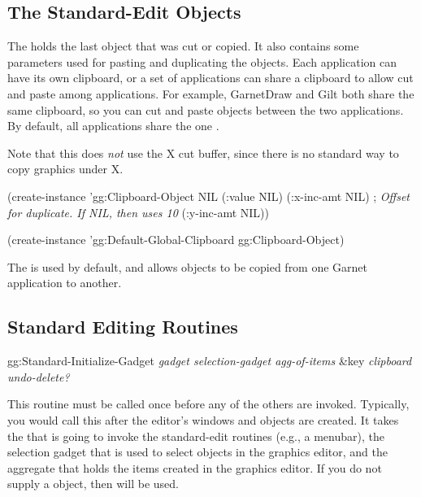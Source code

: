 \subsection{The Standard-Edit Objects}

The  holds the last object that was cut or
copied.  It also contains some parameters used for pasting and
duplicating the objects.  Each application can have its own
clipboard, or a set of applications can share a clipboard to allow cut
and paste among applications.  For example, GarnetDraw and Gilt both share
the same clipboard, so you can cut and paste objects between the two
applications.  By default, all applications share the
one .

Note that this does {\it not} use the X cut buffer, since there is no
standard way to copy graphics under X.

\begin{programexample}
(create-instance 'gg:Clipboard-Object NIL
  (:value NIL)
  (:x-inc-amt NIL)  ; {\it Offset for duplicate.  If NIL, then uses 10}
  (:y-inc-amt NIL))

(create-instance 'gg:Default-Global-Clipboard gg:Clipboard-Object)
\end{programexample}

The  is used by default, and allows
objects to be copied from one Garnet application to another.


\subsection{Standard Editing Routines}

\begin{programexample}
gg:Standard-Initialize-Gadget {\it gadget  selection-gadget  agg-of-items} \value{function}
                              \&key {\it clipboard  undo-delete?}
\end{programexample}

This routine must be called once before any of the others are invoked.
Typically, you would call this after the editor's windows and objects
are created.  It takes the  that is going to invoke the
standard-edit routines (e.g., a menubar), the selection gadget that
is used to select objects in the graphics editor, and the aggregate
that holds the items created in the graphics editor.
If you do not supply a  object, then
 will be used.

